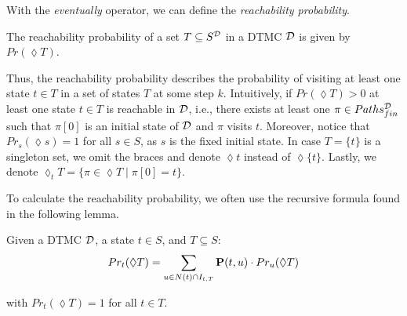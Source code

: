 With the \textit{eventually} operator, we can define the \textit{reachability probability}.
\begin{definition}
    The reachability probability of a set $T \subseteq S^{\mathcal{D}}$ in a DTMC $\mathcal{D}$ is given by $Pr(\lozenge T)$.
\end{definition}
Thus, the reachability probability describes the probability of visiting at least one state $t\in T$ in a set of states $T$ at some step $k$. Intuitively, if $Pr(\lozenge T) >0$ at least one state $t\in T$ is reachable in $\mathcal{D}$, i.e., there exists at least one $\pi \in Paths^{\mathcal{D}}_{fin}$ such that $\pi[0]$ is an initial state of $\mathcal{D}$ and $\pi$ visits $t$. Moreover, notice that $Pr_s(\lozenge s) = 1$ for all $s\in S$, as $s$ is the fixed initial state.
In case $T = \{t\}$ is a singleton set, we omit the braces and denote $\lozenge t$ instead of $\lozenge \{t\}$. Lastly, we denote $\lozenge_t T = \{\pi\in \lozenge T \mid \pi[0] = t\}$.

To calculate the reachability probability, we often use the recursive formula found in the following lemma.
\begin{lemma}\label{lem:recursive_formula_for_reachability_prob}
    Given a DTMC $\mathcal{D}$, a state $t \in S$, and $T\subseteq S$:
    \[Pr_t(\lozenge T) = \sum_{u\in N(t)\cap I_{t,T}}\mathbf{P}(t,u) \cdot Pr_u(\lozenge T)\]

    with $Pr_t(\lozenge T) = 1$ for all $t\in T$.
\end{lemma}

